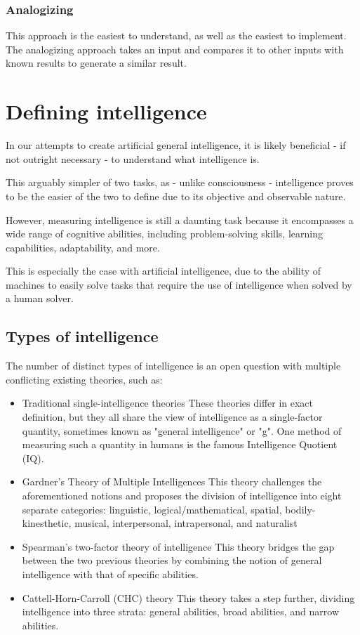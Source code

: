 \documentclass[masterthesis]{fer}
\begin{document}
\subsubsection{Analogizing}
This approach is the easiest to understand, as well as the easiest to implement. The analogizing approach takes an input and compares it to other inputs with known results to generate a similar result.

\section{Defining intelligence}
In our attempts to create artificial general intelligence, it is likely beneficial - if not outright necessary - to understand what intelligence is.

This  arguably simpler of two tasks, as - unlike consciousness - intelligence proves to be the easier of the two to define due to its objective and observable nature. 

However, measuring intelligence is still a daunting task because it encompasses a wide range of cognitive abilities, including problem-solving skills, learning capabilities, adaptability, and more.

This is especially the case with artificial intelligence, due to the ability of machines to easily solve tasks that require the use of intelligence when solved by a human solver.
\subsection{Types of intelligence}
The number of distinct types of intelligence is an open question with multiple conflicting existing theories, such as: %
\begin{itemize}
\item{Traditional single-intelligence theories}
These theories differ in exact definition, but they all share the view of intelligence as a single-factor quantity, sometimes known as "general intelligence" or "g". One method of measuring such a quantity in humans is the famous Intelligence Quotient (IQ).
\item{Gardner's Theory of Multiple Intelligences}
This theory challenges the aforementioned notions and proposes the division of intelligence into eight separate categories: linguistic, logical/mathematical, spatial, bodily-kinesthetic, musical, interpersonal, intrapersonal, and naturalist
\item{Spearman's two-factor theory of intelligence}
This theory bridges the gap between the two previous theories by combining the notion of general intelligence with that of specific abilities.
\item{Cattell-Horn-Carroll (CHC) theory}
This theory takes a step further, dividing intelligence into three strata: general abilities, broad abilities, and narrow abilities.
\end{itemize}
\end{document}
